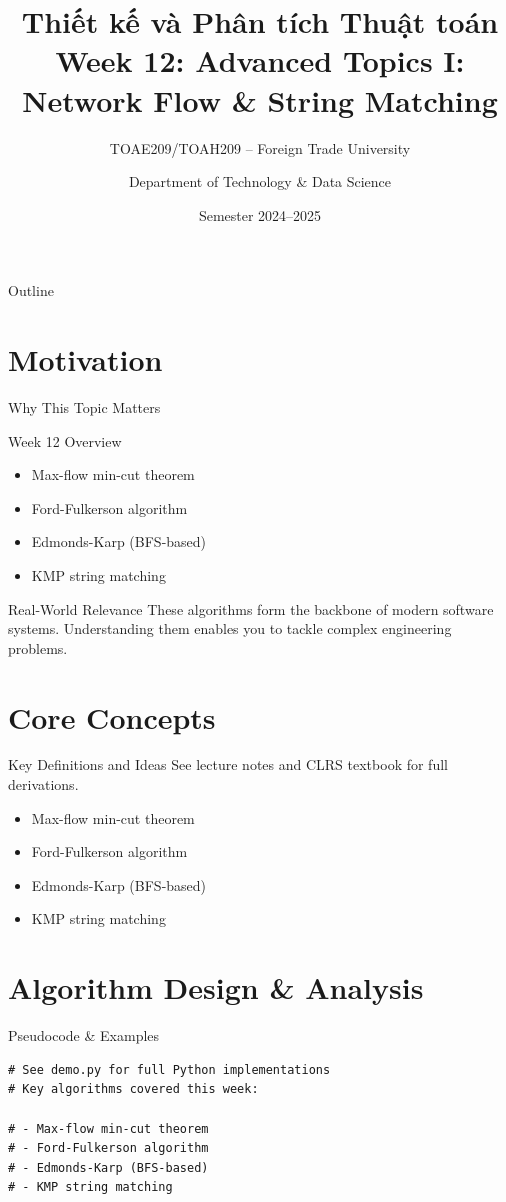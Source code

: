 \documentclass[aspectratio=169,xcolor=dvipsnames]{beamer}
\title[Algorithms -- Week 12]{\textbf{Thiết kế và Phân tích Thuật toán}\\
  \large Week 12: Advanced Topics I: Network Flow & String Matching}
\subtitle{TOAE209/TOAH209 -- Foreign Trade University}
\author{Department of Technology \& Data Science}
\date{Semester 2024--2025}
\begin{document}
\begin{frame}\titlepage\end{frame}
\begin{frame}{Outline}\tableofcontents\end{frame}

\section{Motivation}
\begin{frame}{Why This Topic Matters}
  \begin{block}{Week 12 Overview}
    \begin{itemize}
    \item Max-flow min-cut theorem
    \item Ford-Fulkerson algorithm
    \item Edmonds-Karp (BFS-based)
    \item KMP string matching
    \end{itemize}
  \end{block}
  \begin{exampleblock}{Real-World Relevance}
    These algorithms form the backbone of modern software systems.
    Understanding them enables you to tackle complex engineering problems.
  \end{exampleblock}
\end{frame}

\section{Core Concepts}
\begin{frame}{Key Definitions and Ideas}
  See lecture notes and CLRS textbook for full derivations.
  \begin{itemize}
    \item Max-flow min-cut theorem
    \item Ford-Fulkerson algorithm
    \item Edmonds-Karp (BFS-based)
    \item KMP string matching
  \end{itemize}
\end{frame}

\section{Algorithm Design \& Analysis}
\begin{frame}[fragile]{Pseudocode \& Examples}
  \begin{lstlisting}
# See demo.py for full Python implementations
# Key algorithms covered this week:

# - Max-flow min-cut theorem
# - Ford-Fulkerson algorithm
# - Edmonds-Karp (BFS-based)
# - KMP string matching
  \end{lstlisting}
\end{frame}
\end{document}
